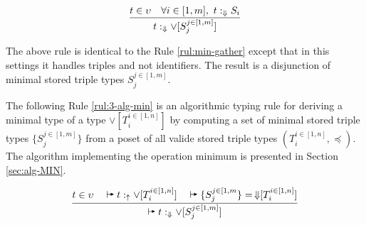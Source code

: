 \documentclass[runningheads]{llncs}
\newcommand{\uarr}{\uparrow}
\newcommand{\Darr}{\Downarrow}
\newcommand{\vdasharr}{%
    \mathrel{%
        \vdash\hspace*{-5pt}%
        \raisebox{2.3pt}{\scalebox{.5}{\(\blacktriangleright\)}}%
    }%
}\newcommand{\D}{{\Delta}}
\newcommand{\memo}[1]{}
\newcommand{\notes}[1]{\noindent\begin{small}-- \emph{#1}\hfill\break\end{small}}
\newcommand{\nnotes}[1]{\indent\begin{small}-- \emph{#1}\hfill\break\end{small}}
\begin{document}
\begin{equation}
\label{rul:3-min-gather}
\dfrac{t\in\upsilon\quad\forall\/i\in[1,m],\ t:_\Darr\/S_i}
      {t:_{\Darr}\lor[S_j^{j\in[1,m]}]}
\end{equation}

The above rule is identical to the Rule \ref{rul:min-gather} except
that in this settings it handles triples and not identifiers. The
result is a disjunction of minimal stored triple types $S_j^{j\in[1,m]}$.

The following Rule \ref{rul:3-alg-min} is an algorithmic typing rule
for deriving a minimal type of a type $\lor[T_i^{i\in[1,n]}]$ by
computing a set of minimal stored triple types $\{S_j^{j\in[1,m]}\}$
from a poset of all valide stored triple types
$(T_i^{i\in[1,n]},\preceq)$. The algorithm implementing the operation
minimum is presented in Section \ref{sec:alg-MIN}.

\begin{equation}
\label{rul:3-alg-min}
\dfrac{t\in\upsilon\quad\vdasharr\/t:_\uarr\lor[T_i^{i\in[1,n]}]\quad\vdasharr\/\{S_j^{j\in[1,m}\}=\,\Darr\kern -3pt[T_i^{i\in[1,n]}]}
{\vdasharr\/t:_{\Darr}\lor\/[S_j^{j\in[1,m]}]}
\end{equation}

\memo{
\notes{If $p$ inherits from multiple $p'\succeq\/p$, then the above rule generates multiple types. Explain.}
\nnotes{The type is determined only if the domain and range of $p'\succeq\/p$ is defined.}
\nnotes{Otherwise, the domain and range shoud be $\top$. This should be included.}}

\memo{
Somewhere here, the inheritance should be noted.
Inheritance should be treated in knowledge graphs!
Predicates inherit in the same way as the classes.

\notes{What is the meaning of triple types that are \emph{not comparable} ($\not\sim$).}
\nnotes{1. This can be either that we have two $p$ roots with unrelated MIN triple types.}
\nnotes{This is possible only if $p$ is defined for semantically different concepts.}
\nnotes{2. Two $p$-rooted but unrelated stored types through multiple inheritance.}
\nnotes{Therefore, we can have more than one stored MIN types.}}

\memo{
The implementation view of the above rule is as follows. The schema
triples are obtained from the inherited values of the predicates
rdfs:domain and rdfs:range. The inherited values have to be the
closest when traveling from property $p$ towards the more general
properties.}
\end{document}
